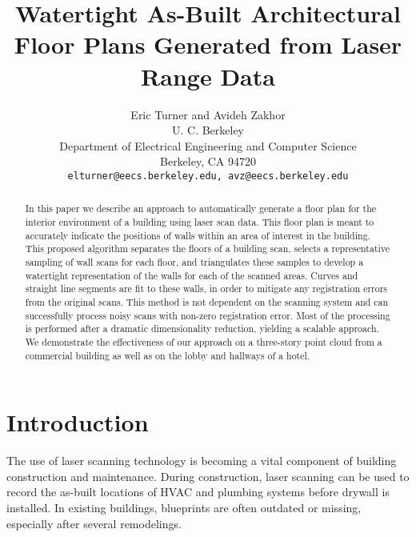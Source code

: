 \documentclass[10pt,twocolumn,letterpaper]{article}
\begin{document}
\title{Watertight As-Built Architectural Floor Plans Generated from Laser Range Data}

\author{Eric Turner and Avideh Zakhor\\
U. C. Berkeley\\
Department of Electrical Engineering and Computer Science \\
Berkeley, CA 94720\\
{\tt\small elturner@eecs.berkeley.edu, avz@eecs.berkeley.edu}
}

\maketitle

\begin{abstract}
In this paper we describe an approach to automatically generate a floor plan for the interior environment of a building using laser scan data.  This floor plan is meant to accurately indicate the positions of walls within an area of interest in the building.  This proposed algorithm separates the floors of a building scan, selects a representative sampling of wall scans for each floor, and triangulates these samples to develop a watertight representation of the walls for each of the scanned areas. Curves and straight line segments are fit to these walls, in order to mitigate any registration errors from the original scans.  This method is not dependent on the scanning system and can successfully process noisy scans with non-zero registration error.  Most of the processing is performed after a dramatic dimensionality reduction, yielding a scalable approach.  We demonstrate the effectiveness of our approach on a three-story point cloud from a commercial building as well as on the lobby and hallways of a hotel.
\end{abstract}

\section{Introduction}

The use of laser scanning technology is becoming a vital component of
building construction and maintenance.  During construction, laser scanning
can be used to record the as-built locations of HVAC and plumbing systems
before drywall is installed.  In existing buildings, blueprints are often
outdated or missing, especially after several remodelings.
\end{document}
